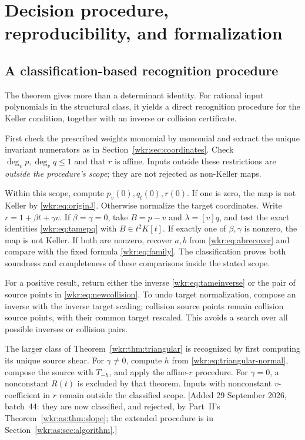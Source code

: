\documentclass[11pt,a4paper]{article}
\numberwithin{equation}{section}
\theoremstyle{definition}
\theoremstyle{remark}
\newcommand{\coeff}[2]{[#1]#2}
\begin{document}
\section{Decision procedure, reproducibility, and formalization}
\label{wkr:sec:verification}

\subsection{A classification-based recognition procedure}

The theorem gives more than a determinant identity. For rational input
polynomials in the structural class, it yields a direct recognition
procedure for the Keller condition, together with an inverse or collision
certificate.

First check the prescribed weights monomial by monomial and extract the
unique invariant numerators as in Section~\ref{wkr:sec:coordinates}. Check
$\deg_vp,\deg_vq\le1$ and that $r$ is affine. Inputs outside these
restrictions are \emph{outside the procedure's scope}; they are not
rejected as non-Keller maps.

Within this scope, compute $p_v(0),q_t(0),r(0)$. If one is zero, the map
is not Keller by \eqref{wkr:eq:originJ}. Otherwise normalize the target
coordinates. Write $r=1+\beta t+\gamma v$. If $\beta=\gamma=0$, take
$B=p-v$ and $\lambda=\coeff{v}{q}$, and test the exact identities
\eqref{wkr:eq:tamepq} with $B\in t^2K[t]$. If exactly one of $\beta,\gamma$
is nonzero, the map is not Keller. If both are nonzero, recover $a,b$ from
\eqref{wkr:eq:abrecover} and compare with the fixed formula
\eqref{wkr:eq:family}. The classification proves both soundness and completeness
of these comparisons inside the stated scope.

For a positive result, return either the inverse
\eqref{wkr:eq:tameinverse} or the pair of source points in
\eqref{wkr:eq:newcollision}. To undo target normalization, compose an inverse
with the inverse target scaling; collision source points remain collision
source points, with their common target rescaled. This avoids a search over
all possible inverses or collision pairs.

The larger class of Theorem~\ref{wkr:thm:triangular} is recognized by first
computing its unique source shear. For $\gamma\ne0$, compute $h$ from
\eqref{wkr:eq:triangular-normal}, compose the source with $T_{-h}$, and apply
the affine-$r$ procedure. For $\gamma=0$, a nonconstant $R(t)$ is excluded
by that theorem. Inputs with nonconstant $v$-coefficient in $r$ remain
outside the classified scope.
[Added 29 September 2026, batch~44: they are now classified, and
rejected, by Part~II's Theorem~\ref{wkr:as:thm:slope}; the extended
procedure is in Section~\ref{wkr:as:sec:algorithm}.]
\end{document}
